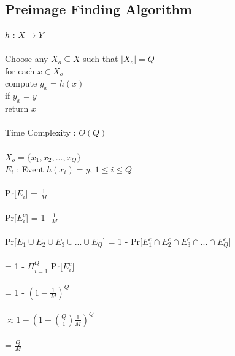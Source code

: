 \documentclass[11pt]{article}
\begin{document}
\subsection*{Preimage Finding Algorithm}
$h$ : $X \rightarrow Y$ \\\\
Choose any $X_{o} \subseteq X$ such that $|X_{o}| = Q$ \\
\hspace*{1.4cm}for each $x \in X_{o}$ \\
\hspace*{2cm}compute $y_{x} = h(x)$ \\
\hspace*{2cm}if $y_{x} = y$ \\
\hspace*{2.5cm}return $x$ \\\\
Time Complexity : $O(Q)$ \\\\
$X_{o} = \{x_{1},x_{2},...,x_{Q}\}$\\
$E_{i}$ : Event $h(x_{i}) = y$, \hspace{1cm} $1 \leq i \leq Q$\\\\
Pr[$E_{i}$] = $\frac{1}{M}$ \\\\
Pr[$E_{i}^{c}$] = 1- $\frac{1}{M}$  \\\\
Pr[$E_{1} \cup E_{2} \cup E_{3} \cup ... \cup E_{Q}$] = 1 - Pr[$E_{1}^{c} \cap E_{2}^{c} \cap E_{3}^{c} \cap ... \cap E_{Q}^{c}$] \\\\
\hspace*{4.55cm} = 1 - $ \Pi_{i=1}^{Q}$ Pr[$E_{i}^{c}$] \\\\
\hspace*{4.55cm} = 1 - $(1- \frac{1}{M})^{Q}$ \\\\
\hspace*{4.55cm} $\approx 1 - (1- \binom Q1 \frac{1}{M})^{Q}$ \\\\
\hspace*{4.55cm} = $\frac{Q}{M}$
\end{document}
